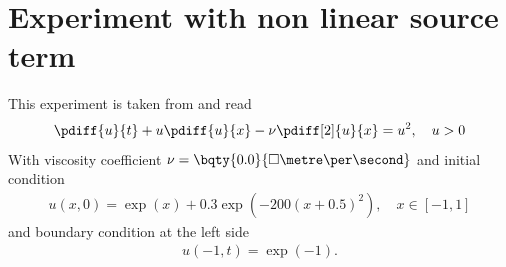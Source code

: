 \section{Experiment with non linear source term}
This experiment is taken from \citet{ColomboEtAl2026} and read
\begin{align}
    \pdiff{u}{t} + u \pdiff{u}{x} - \nu \pdiff[2]{u}{x}= u^2, \quad u >0
\end{align}
With viscosity coefficient $\nu = \bqty{0.0}{\square\metre\per\second}$ and initial condition
\begin{align}
u(x,0) = \exp(x) + 0.3 \exp( -200 (x + 0.5)^2), \quad x \in [-1,1]
\end{align}
and boundary condition at the left side
\begin{align}
    u(-1,t) = \exp(-1).
\end{align}

\notyet